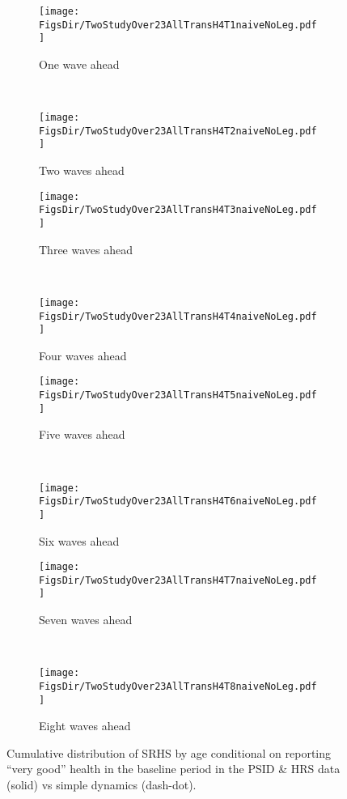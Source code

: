 \documentclass[12pt,pdftex,letterpaper]{article}
\newcommand{\RootDir}{..}
\newcommand{\FigsDir}{\RootDir/Figures}
\begin{document}
\begin{figure}
	\centering
	\begin{subfigure}[b]{0.45\textwidth}
		\texttt{[image: \\FigsDir/TwoStudyOver23AllTransH4T1naiveNoLeg.pdf]}
		\caption{One wave ahead}\label{fig:Naive1AheadVeryGood}
	\end{subfigure}
	~
	\begin{subfigure}[b]{0.45\textwidth}
		\texttt{[image: \\FigsDir/TwoStudyOver23AllTransH4T2naiveNoLeg.pdf]}
		\caption{Two waves ahead}\label{fig:Naive2AheadVeryGood}
	\end{subfigure}
	
	\begin{subfigure}[b]{0.45\textwidth}
		\texttt{[image: \\FigsDir/TwoStudyOver23AllTransH4T3naiveNoLeg.pdf]}
		\caption{Three waves ahead}\label{fig:Naive3AheadVeryGood}
	\end{subfigure}
	~
	\begin{subfigure}[b]{0.45\textwidth}
		\texttt{[image: \\FigsDir/TwoStudyOver23AllTransH4T4naiveNoLeg.pdf]}
		\caption{Four waves ahead}\label{fig:Naive4AheadVeryGood}
	\end{subfigure}
	
	\begin{subfigure}[b]{0.45\textwidth}
		\texttt{[image: \\FigsDir/TwoStudyOver23AllTransH4T5naiveNoLeg.pdf]}
		\caption{Five waves ahead}\label{fig:Naive5AheadVeryGood}
	\end{subfigure}
	~
	\begin{subfigure}[b]{0.45\textwidth}
		\texttt{[image: \\FigsDir/TwoStudyOver23AllTransH4T6naiveNoLeg.pdf]}
		\caption{Six waves ahead}\label{fig:Naive6AheadVeryGood}
	\end{subfigure}
	
	\begin{subfigure}[b]{0.45\textwidth}
		\texttt{[image: \\FigsDir/TwoStudyOver23AllTransH4T7naiveNoLeg.pdf]}
		\caption{Seven waves ahead}\label{fig:Naive7AheadVeryGood}
	\end{subfigure}
	~
	\begin{subfigure}[b]{0.45\textwidth}
		\texttt{[image: \\FigsDir/TwoStudyOver23AllTransH4T8naiveNoLeg.pdf]}
		\caption{Eight waves ahead}\label{fig:Naive8AheadVeryGood}
	\end{subfigure}
	\caption{Cumulative distribution of SRHS by age conditional on reporting ``very good'' health in the baseline period in the PSID \& HRS data (solid) vs simple dynamics (dash-dot).}\label{fig:NaiveTransVGa}
\end{figure}
\end{document}
